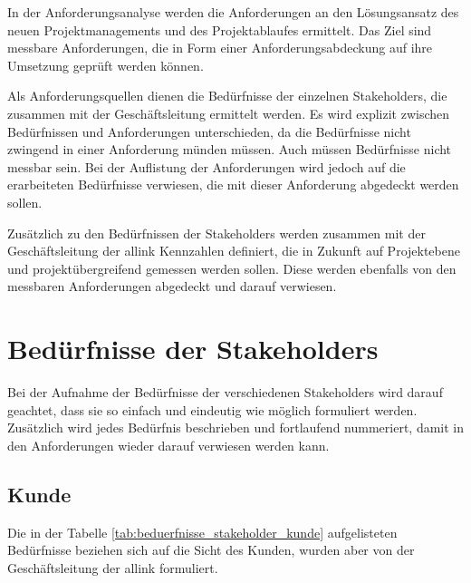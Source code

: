 In der Anforderungsanalyse werden die Anforderungen an den Lösungsansatz des
neuen Projektmanagements und des Projektablaufes ermittelt. Das Ziel sind messbare
Anforderungen, die in Form einer Anforderungsabdeckung auf ihre Umsetzung
geprüft werden können.

Als Anforderungsquellen dienen die Bedürfnisse der einzelnen Stakeholders, die 
zusammen mit der Geschäftsleitung ermittelt werden. Es wird explizit zwischen
Bedürfnissen und Anforderungen unterschieden, da die Bedürfnisse nicht zwingend
in einer Anforderung münden müssen. Auch müssen Bedürfnisse nicht messbar sein.
Bei der Auflistung der Anforderungen wird jedoch auf die erarbeiteten Bedürfnisse 
verwiesen, die mit dieser Anforderung abgedeckt werden sollen.

Zusätzlich zu den Bedürfnissen der Stakeholders werden zusammen mit der Geschäftsleitung
der allink Kennzahlen definiert, die in Zukunft auf Projektebene und projektübergreifend
gemessen werden sollen. Diese werden ebenfalls von den messbaren Anforderungen
abgedeckt und darauf verwiesen.

\section{Bedürfnisse der Stakeholders}

Bei der Aufnahme der Bedürfnisse der verschiedenen Stakeholders wird darauf geachtet, dass sie so einfach und 
eindeutig wie möglich formuliert werden. Zusätzlich wird jedes Bedürfnis beschrieben
und fortlaufend nummeriert, damit in den Anforderungen wieder darauf verwiesen
werden kann.

\subsection{Kunde}
Die in der Tabelle \ref{tab:beduerfnisse_stakeholder_kunde} aufgelisteten 
Bedürfnisse beziehen sich auf die Sicht des Kunden, wurden aber von der
Geschäftsleitung der allink formuliert.

\clearpage

